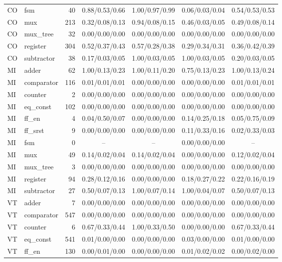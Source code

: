 \begin{table}[t]
{\begin{tabular}{@{}llrcccc@{}}
CO & fsm & 40 & 0.88/0.53/0.66 & 1.00/0.97/0.99 & 0.06/0.03/0.04 & 0.54/0.53/0.53 \\
CO & mux & 213 & 0.32/0.08/0.13 & 0.94/0.08/0.15 & 0.46/0.03/0.05 & 0.49/0.08/0.14 \\
CO & mux\_tree & 32 & 0.00/0.00/0.00 & 0.00/0.00/0.00 & 0.00/0.00/0.00 & 0.00/0.00/0.00 \\
CO & register & 304 & 0.52/0.37/0.43 & 0.57/0.28/0.38 & 0.29/0.34/0.31 & 0.36/0.42/0.39 \\
CO & subtractor & 38 & 0.17/0.03/0.05 & 1.00/0.03/0.05 & 1.00/0.03/0.05 & 0.20/0.03/0.05 \\
MI & adder & 62 & 1.00/0.13/0.23 & 1.00/0.11/0.20 & 0.75/0.13/0.23 & 1.00/0.13/0.24 \\
MI & comparator & 116 & 0.01/0.01/0.01 & 0.00/0.00/0.00 & 0.00/0.00/0.00 & 0.01/0.01/0.01 \\
MI & counter & 2 & 0.00/0.00/0.00 & 0.00/0.00/0.00 & 0.00/0.00/0.00 & 0.00/0.00/0.00 \\
MI & eq\_const & 102 & 0.00/0.00/0.00 & 0.00/0.00/0.00 & 0.00/0.00/0.00 & 0.00/0.00/0.00 \\
MI & ff\_en & 4 & 0.04/0.50/0.07 & 0.00/0.00/0.00 & 0.14/0.25/0.18 & 0.05/0.75/0.09 \\
MI & ff\_srst & 9 & 0.00/0.00/0.00 & 0.00/0.00/0.00 & 0.11/0.33/0.16 & 0.02/0.33/0.03 \\
MI & fsm & 0 & -- & -- & 0.00/0.00/0.00 & -- \\
MI & mux & 49 & 0.14/0.02/0.04 & 0.14/0.02/0.04 & 0.00/0.00/0.00 & 0.12/0.02/0.04 \\
MI & mux\_tree & 3 & 0.00/0.00/0.00 & 0.00/0.00/0.00 & 0.00/0.00/0.00 & 0.00/0.00/0.00 \\
MI & register & 94 & 0.28/0.12/0.16 & 0.00/0.00/0.00 & 0.18/0.27/0.22 & 0.22/0.16/0.19 \\
MI & subtractor & 27 & 0.50/0.07/0.13 & 1.00/0.07/0.14 & 1.00/0.04/0.07 & 0.50/0.07/0.13 \\
VT & adder & 7 & 0.00/0.00/0.00 & 0.00/0.00/0.00 & 0.00/0.00/0.00 & 0.00/0.00/0.00 \\
VT & comparator & 547 & 0.00/0.00/0.00 & 0.00/0.00/0.00 & 0.00/0.00/0.00 & 0.00/0.00/0.00 \\
VT & counter & 6 & 0.67/0.33/0.44 & 1.00/0.33/0.50 & 0.00/0.00/0.00 & 0.67/0.33/0.44 \\
VT & eq\_const & 541 & 0.01/0.00/0.00 & 0.00/0.00/0.00 & 0.03/0.00/0.00 & 0.01/0.00/0.00 \\
VT & ff\_en & 130 & 0.00/0.01/0.00 & 0.00/0.00/0.00 & 0.01/0.02/0.02 & 0.00/0.02/0.00 \\

\end{tabular}}
\end{table}
